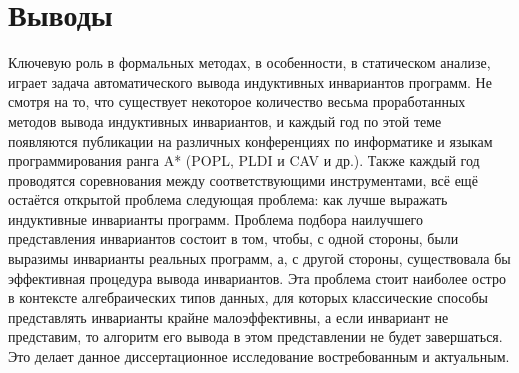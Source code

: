 \section{Выводы}\label{sec:background/conclusion}
Ключевую роль в формальных методах, в особенности, в статическом анализе, играет задача автоматического вывода индуктивных инвариантов программ.
Не смотря на то, что существует некоторое количество весьма проработанных методов вывода индуктивных инвариантов,
и каждый год по этой теме появляются публикации  на различных конференциях по информатике и языкам программирования ранга A* (POPL, PLDI и CAV и др.).
Также каждый год проводятся соревнования между соответствующими инструментами,
всё ещё остаётся открытой проблема следующая проблема: как лучше выражать индуктивные инварианты программ.
Проблема подбора наилучшего представления инвариантов состоит в том, чтобы, с одной стороны, были выразимы инварианты реальных программ, а, с другой стороны, существовала бы эффективная процедура вывода инвариантов.
Эта проблема стоит наиболее остро в контексте алгебраических типов данных, для которых классические способы представлять инварианты крайне малоэффективны, а если инвариант не представим, то алгоритм его вывода в этом представлении не будет завершаться.
Это делает данное диссертационное исследование востребованным и актуальным.
